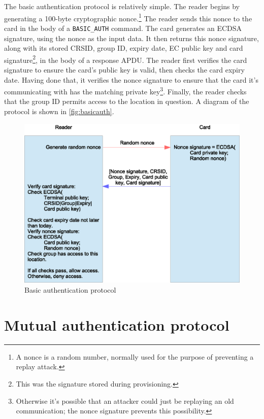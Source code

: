 \documentclass[12pt,a4paper,twoside,openright]{report}
\begin{document}
The basic authentication protocol is relatively simple. The reader begins by generating a 100-byte cryptographic nonce.\footnote{A nonce is a random number, normally used for the purpose of preventing a replay attack.} The reader sends this nonce to the card in the body of a \texttt{BASIC\_AUTH} command. The card generates an ECDSA signature, using the nonce as the input data. It then returns this nonce signature, along with its stored CRSID, group ID, expiry date, EC public key and card signature\footnote{This was the signature stored during provisioning.}, in the body of a response APDU. The reader first verifies the card signature to ensure the card's public key is valid, then checks the card expiry date. Having done that, it verifies the nonce signature to ensure that the card it's communicating with has the matching private key\footnote{Otherwise it's possible that an attacker could just be replaying an old communication; the nonce signature prevents this possibility.}. Finally, the reader checks that the group ID permits access to the location in question. A diagram of the protocol is shown in \autoref{fig:basicauth}.

\begin{figure}[tbh]
\centerline{\includegraphics[scale=0.8]{figures/basicauth.eps}}
\caption{Basic authentication protocol}
\label{fig:basicauth}
\end{figure}

\section{Mutual authentication protocol}
\label{mutualauth}
\end{document}
